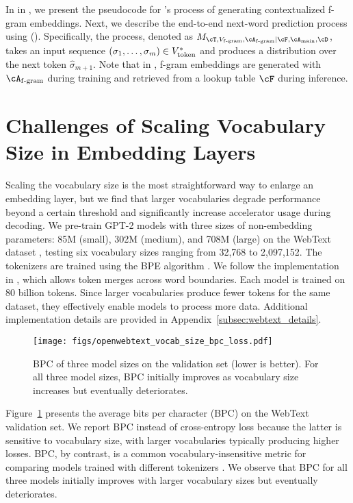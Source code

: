 In  in , we present the pseudocode for \SCONE's process of generating contextualized f-gram embeddings. Next, we describe the end-to-end next-word prediction process using \SCONE (). Specifically, the process, denoted as $M_{\cT, \Vfgram, \train{\Afgram} | \infer{\cF}, \Amain, \cD}$, takes an input sequence $(\sigma_1, \ldots, \sigma_m) \in V_{\mathrm{token}}^*$ and produces a distribution over the next token $\hat{\sigma}_{m+1}$. Note that in , f-gram embeddings are generated with $\Afgram$ during training and retrieved from a lookup table $\cF$ during inference.



\section{Challenges of Scaling Vocabulary Size in Embedding Layers}
\label{sec:scale_vocab}

Scaling the vocabulary size is the most straightforward way to enlarge an embedding layer, but we find that larger vocabularies degrade performance beyond a certain threshold and significantly increase accelerator usage during decoding. We pre-train GPT-2 models \citep{radford2019language} with three sizes of non-embedding parameters: 85M (small), 302M (medium), and 708M (large) on the WebText dataset \citep{openwebtext}, testing six vocabulary sizes ranging from 32,768 to 2,097,152. The tokenizers are trained using the BPE algorithm \citep{gage1994new, sennrich2015neural}. We follow the implementation in \citet{tao2024scaling}, which allows token merges across word boundaries. Each model is trained on 80 billion tokens. Since larger vocabularies produce fewer tokens for the same dataset, they effectively enable models to process more data. Additional implementation details are provided in Appendix~\ref{subsec:webtext_details}.

\begin{figure}[h]
    \centering
    \texttt{[image: figs/openwebtext\_vocab\_size\_bpc\_loss.pdf]}
    \caption{BPC of three model sizes on the validation set (lower is better). For all three model sizes, BPC initially improves as vocabulary size increases but eventually deteriorates.}
    \label{fig:bpc_vary_vocab}
\end{figure}

Figure~\ref{fig:bpc_vary_vocab} presents the average bits per character (BPC) on the WebText validation set. We report BPC instead of cross-entropy loss because the latter is sensitive to vocabulary size, with larger vocabularies typically producing higher losses. BPC, by contrast, is a common vocabulary-insensitive metric for comparing models trained with different tokenizers \citep{huang2024compression}. We observe that BPC for all three models initially improves with larger vocabulary sizes but eventually deteriorates.


